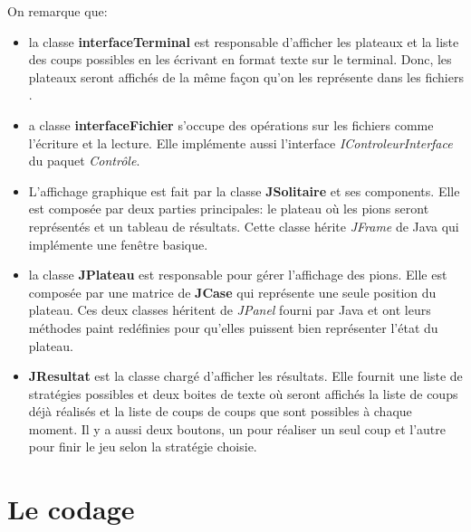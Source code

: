 \documentclass{article}
\begin{document}
On remarque que:

\begin{itemize}
  \item la classe \textbf{interfaceTerminal} est responsable d'afficher les
  plateaux et la liste des coups possibles en les écrivant en format texte sur
  le terminal. Donc, les plateaux seront affichés de la même façon qu’on les
  représente dans les fichiers .
  
  \vspace{12pt}
  
  \item a classe \textbf{interfaceFichier} s’occupe des opérations sur les
  fichiers comme l’écriture et la lecture. Elle implémente aussi l’interface 
  \textit{IControleurInterface} du paquet \textit{Contrôle}.
    
  \vspace{12pt}
  
  \item L’affichage graphique est fait par la classe \textbf{JSolitaire} et ses
  components. Elle est composée par deux parties principales: le plateau où les
  pions seront représentés et un tableau de résultats. Cette classe hérite
  \textit{JFrame} de Java qui implémente une fenêtre basique.
  
  \vspace{12pt}
  
  \item la classe \textbf{JPlateau} est responsable pour gérer l’affichage des
  pions.  Elle est composée par une matrice de \textbf{JCase} qui représente une
  seule position du plateau. Ces deux classes héritent de \textit{JPanel} fourni
  par Java et ont leurs méthodes paint redéfinies pour qu’elles puissent bien
  représenter l’état du plateau.

  \vspace{12pt}
  
  \item \textbf{JResultat} est la classe  chargé d’afficher les résultats. Elle
  fournit une liste de stratégies possibles et deux boites de texte où seront
  affichés la liste de coups déjà réalisés et la liste de coups de coups que
  sont possibles à chaque moment. Il y a aussi deux boutons, un pour réaliser un
  seul coup et l’autre pour finir le jeu selon la stratégie choisie.
  
\end{itemize}

\section{Le codage}
\end{document}
